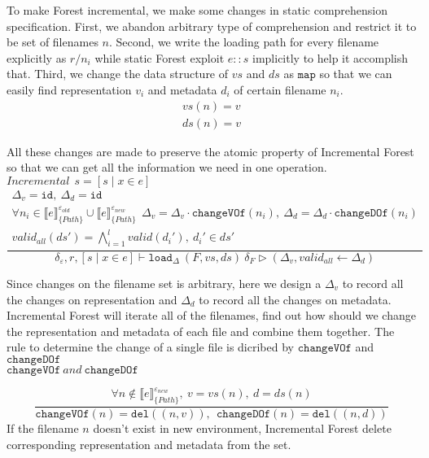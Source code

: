 \documentclass[10pt,twoside,a4paper]{article}
\theoremstyle{theorem}
\theoremstyle{lemma}
\theoremstyle{property}
\theoremstyle{definition}
\theoremstyle{assumption}
\begin{document}
To make Forest incremental, we make some changes in static comprehension specification. First, we abandon arbitrary type of comprehension and restrict it to be set of filenames $n$. Second, we write the loading path for every filename explicitly as $r/n_i$ while static Forest exploit $e\!::\!s$ implicitly to help it accomplish that. Third, we change the data structure of $vs$ and $ds$ as $\mathtt{map}$ so that we can easily find representation $v_i$ and metadata $d_i$ of certain filename $n_i$. 
\begin{eqnarray*}
	vs(n) = v \\
	ds(n) = v 
\end{eqnarray*}

All these changes are made to preserve the atomic property of Incremental Forest so that we can get all the information we need in one operation.\\

$\boxed{Incremental~~ s = [ s \mid x \in e]}$
\begin{displaymath}
	\frac{\begin{array}{c}
		\Delta_v = \mathtt{id}, ~\Delta_d = \mathtt{id}\\
		\forall n_i \in \llbracket e \rrbracket^{\varepsilon_{old}}_{\{Path\}} \cup \llbracket e \rrbracket^{\varepsilon_{new}}_{\{Path\}}~~
		\Delta_v = \Delta_v \cdot \mathtt{changeVOf}(n_i),~ \Delta_d = \Delta_d \cdot \mathtt{changeDOf}(n_i)\\
		valid_{all} (ds') = \bigwedge_{i=1}^l valid(d_i'), ~d_i' \in ds'
	\end{array}}
	{\delta_\varepsilon, r, [ s \mid x \in e] \vdash \mathtt{load}_\Delta~ (F,vs,ds)~ \delta_F \rhd (\Delta_v, valid_{all} \leftarrow \Delta_d) }
\end{displaymath}

Since changes on the filename set is arbitrary, here we design a $\Delta_v$ to record all the changes on representation and $\Delta_d$ to record all the changes on metadata. Incremental Forest will iterate all of the filenames, find out how should we change the representation and metadata of each file and combine them together. The rule to determine the change of a single file is dicribed by $\mathtt{changeVOf}$ and $\mathtt{changeDOf}$\\ 

$\boxed{\mathtt{changeVOf} ~ and ~ \mathtt{changeDOf}}$

\begin{displaymath}
	\frac
	{\forall n \not\in \llbracket e \rrbracket^{\varepsilon_{new}}_{\{Path\}},~ v = vs(n), ~d = ds(n)}
	{\mathtt{changeVOf}(n) = \mathtt{del}((n,v)), ~~\mathtt{changeDOf}(n) = \mathtt{del}((n,d))}
\end{displaymath}
If the filename $n$ doesn't exist in new environment, Incremental Forest delete corresponding representation and metadata from the set.
\end{document}
